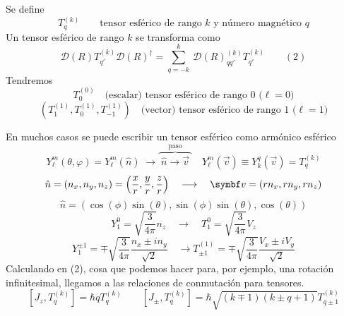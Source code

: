 \documentclass[10pt,oneside]{CBFT_book}
\begin{document}
Se define 
\[
	T^{(k)}_q \qquad \text{tensor esférico de rango $k$ y número magnético $q$}
\]
Un tensor esférico de rango $k$ se transforma como 
\[
	\mathcal{D}(R) T_{q'}^{(k)} \mathcal{D}(R)^\dagger = 
	\sum_{q=-k}^k \: \mathcal{D}(R)_{qq'}^{(k)} T_{q'}^{(k)}  \qquad (2)
\]
Tendremos 
\[
	T^{(0)}_0 \quad \text{(escalar) tensor esférico de rango 0 ($\ell=0$)}
\]
\[
	(T^{(1)}_1,T^{(1)}_0,T^{(1)}_{-1}) \quad \text{(vector) tensor esférico de rango 1 ($\ell=1$)}
\]

En muchos casos se puede escribir un tensor esférico como armónico esférico 
\[
	Y_\ell^{m}(\theta,\varphi) = Y_\ell^{m}(\hat{n}) \; \longrightarrow 
	\overbrace{ \phantom{.}\hat{n} \longrightarrow \vec{v}\phantom{.}}^{\text{paso}} \quad
	Y_\ell^m(\vec{v}) \equiv Y_k^q(\vec{v}) = T_q^{(k)}
\]
\[
	\hat{n} = (n_x,n_y,n_z) = \left( \frac{x}{r}, \frac{y}{r}, \frac{z}{r} \right) \quad 
	\longrightarrow \quad \vb{v} = (rn_x,rn_y,rn_z)
\]
\[
	\hat{n} = ( \cos(\phi)\sin(\theta), \sin(\phi)\sin(\theta), \cos(\theta))
\]
\[
	Y_1^0 = \sqrt{\frac{3}{4\pi}}n_z \quad \longrightarrow \quad T_1^0 = \sqrt{\frac{3}{4\pi}}V_z
\]
\[
	Y_1^{\pm 1} = \mp \sqrt{\frac{3}{4\pi}} \frac{n_x \pm i n_y}{\sqrt{2}} \quad \longrightarrow
	T_{\pm 1}^{(1)} = \mp \sqrt{\frac{3}{4\pi}} \frac{V_x \pm i V_y}{\sqrt{2}}
\]
Calculando en (2), cosa que podemos hacer para, por ejemplo, una rotación infinitesimal, llegamos a las 
relaciones de conmutación para tensores.
\[
	[ J_z, T_q^{(k)} ] = \hbar q T_q^{(k)} \qquad 
	[J_{\pm},T_q^{(k)}] = \hbar \sqrt{(k\mp 1)(k\pm q + 1)} T_{q\pm 1}^{(k)}
\]


\end{document}
